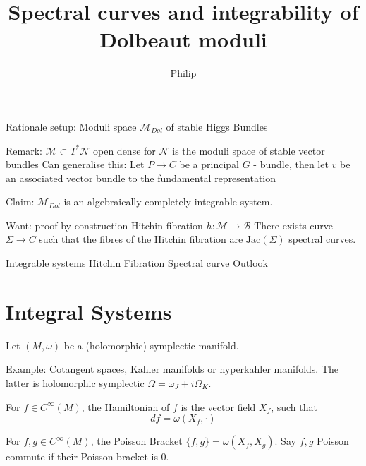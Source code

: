 % 

\title{Spectral curves and integrability of Dolbeaut moduli}
\author{Philip}
\date{}

 
\maketitle

Rationale setup:
Moduli space $\mathcal{M}_{Dol} $ of stable Higgs Bundles 

Remark:
$\mathcal{M} \subset T^* \mathcal{N} $ open dense for $\mathcal{N} $ is the moduli space of stable vector bundles
Can generalise this: 
Let $ P \rightarrow  C $ be a principal $G$ - bundle, 
then let $v$ be an associated vector bundle to the fundamental representation 

Claim: $ \mathcal{M} _{Dol} $ is an algebraically completely integrable system. 

Want: proof by construction 
Hitchin fibration $h : \mathcal{M} \rightarrow \mathcal{B}$ 
There exists curve $ \Sigma \rightarrow  C $ such that the fibres of the Hitchin fibration are $\mathrm{Jac}(\Sigma) $ spectral curves. 



Integrable systems 
Hitchin Fibration 
Spectral curve 
Outlook

\section{Integral Systems} %

Let $(M,\omega) $ be a (holomorphic) symplectic manifold. 

Example: Cotangent spaces, Kahler manifolds or hyperkahler manifolds. 
The latter is holomorphic symplectic $\Omega = \omega_J + i \Omega_K $. 

\begin{definition}
     For $ f \in C^{\infty} (M) $, the Hamiltonian of $f$ is the vector field $X_f $, such that 
     \begin{equation}
            df = \omega(X_f, \cdot) 
     \end{equation}
\end{definition}

\begin{definition}
    For $ f,g \in C^{\infty}(M)$, the Poisson Bracket $\{f, g\} = \omega(X_f, X_g) $. 
    Say $f,g$ Poisson commute if their Poisson bracket is 0. 
\end{definition}

